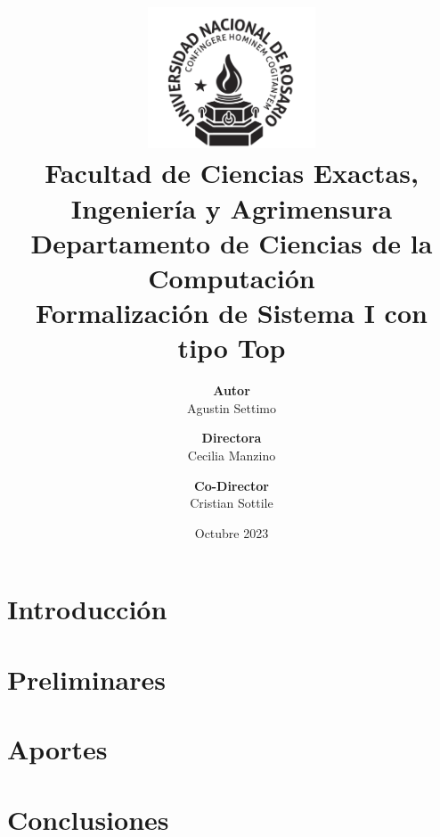 \documentclass[]{report}
\title{
	\includegraphics[width=5cm]{logo.png} \\
	\huge Facultad de Ciencias Exactas,\\ Ingeniería y Agrimensura \\
	\vspace{0.5cm}
	\Large Departamento de Ciencias de la Computación \\
	\vspace{1cm}
	\Huge \textbf{Formalización de Sistema I con tipo Top}
}
\author{
	\textbf{Autor} \\ Agustin Settimo \and
	\textbf{Directora} \\ Cecilia Manzino \and
	\textbf{Co-Director} \\ Cristian Sottile}
\date{Octubre 2023}
\begin{document}
	
	\maketitle
	\tableofcontents
	
	\begin{abstract}
	
	\end{abstract}
	
	\chapter{Introducción}
	
	
	\chapter{Preliminares}
	
	
	\chapter{Aportes}
	
	
	\chapter{Conclusiones}
	
	
	\printbibliography
\end{document}
